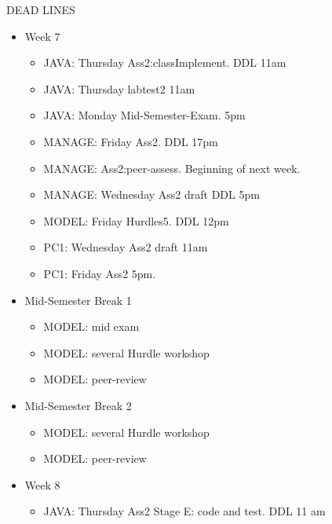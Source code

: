 \documentclass[a3paper,10pt]{report}
\begin{document}
\begin{landscape}
\begin{multicols}{2}
DEAD LINES
\begin{itemize}
\item Week 7
\begin{itemize}
    \item JAVA: Thursday Ass2:classImplement. DDL 11am
    \item JAVA: Thursday labtest2 11am
    \item JAVA: Monday  Mid-Semester-Exam. 5pm
    \item MANAGE: Friday Ass2. DDL 17pm
    \item MANAGE: Ass2:peer-assess. Beginning of next week.
    \item MANAGE: Wednesday Ass2 draft DDL 5pm
    \item MODEL: Friday Hurdles5. DDL 12pm
    \item PC1: Wednesday Ass2 draft 11am
    \item PC1: Friday Ass2 5pm.
\end{itemize}
\item Mid-Semester Break 1
\begin{itemize}
    \item MODEL: mid exam
    \item MODEL: several Hurdle workshop
    \item MODEL: peer-review
\end{itemize}
\item Mid-Semester Break 2
\begin{itemize}
    \item MODEL: several Hurdle workshop
    \item MODEL: peer-review
\end{itemize}
\item Week 8
\begin{itemize}
    \item JAVA: Thursday Ass2 Stage E: code and test. DDL 11 am
\end{itemize}
\end{itemize}
\end{multicols}



\end{landscape} %
\end{document}
